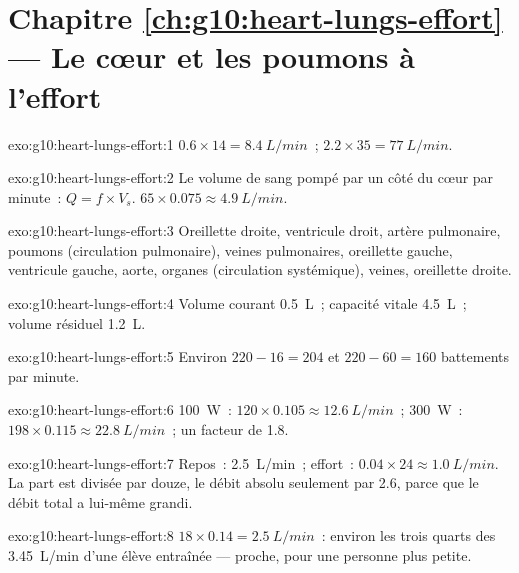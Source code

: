 \section*{Chapitre \ref{ch:g10:heart-lungs-effort} --- Le cœur et les poumons à l'effort}

\begin{solution}{exo:g10:heart-lungs-effort:1}
$0.6 \times 14 = \qty{8.4}{L/min}$~; $2.2 \times 35 = \qty{77}{L/min}$.
\end{solution}

\begin{solution}{exo:g10:heart-lungs-effort:2}
Le volume de sang pompé par un côté du cœur par minute~:
$Q = f \times V_s$. $65 \times 0.075 \approx \qty{4.9}{L/min}$.
\end{solution}

\begin{solution}{exo:g10:heart-lungs-effort:3}
Oreillette droite, ventricule droit, artère pulmonaire, poumons
(circulation pulmonaire), veines pulmonaires, oreillette gauche,
ventricule gauche, aorte, organes (circulation systémique), veines,
oreillette droite.
\end{solution}

\begin{solution}{exo:g10:heart-lungs-effort:4}
Volume courant \qty{0.5}{L}~; capacité vitale \qty{4.5}{L}~; volume
résiduel \qty{1.2}{L}.
\end{solution}

\begin{solution}{exo:g10:heart-lungs-effort:5}
Environ $220 - 16 = 204$ et $220 - 60 = 160$ battements par minute.
\end{solution}

\begin{solution}{exo:g10:heart-lungs-effort:6}
\qty{100}{W}~: $120 \times 0.105 \approx \qty{12.6}{L/min}$~;
\qty{300}{W}~: $198 \times 0.115 \approx \qty{22.8}{L/min}$~; un facteur
de 1.8.
\end{solution}

\begin{solution}{exo:g10:heart-lungs-effort:7}
Repos~: \qty{2.5}{L/min}~; effort~: $0.04 \times 24 \approx
\qty{1.0}{L/min}$. La part est divisée par douze, le débit absolu
seulement par 2.6, parce que le débit total a lui-même grandi.
\end{solution}

\begin{solution}{exo:g10:heart-lungs-effort:8}
$18 \times 0.14 = \qty{2.5}{L/min}$~: environ les trois quarts des
\qty{3.45}{L/min} d'une élève entraînée --- proche, pour une personne
plus petite.
\end{solution}

